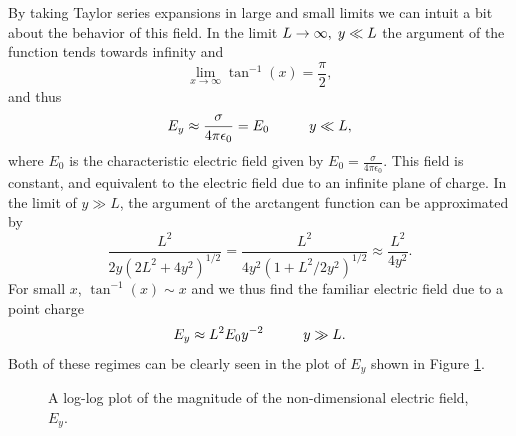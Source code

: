 \documentclass[12pt,a4paper,oneside]{book}
\begin{document}
By taking Taylor series expansions in large and small limits we can intuit a bit about the behavior of this field. In the limit $L \rightarrow \infty, \hspace{1mm} y \ll L$ the argument of the function tends towards infinity and
\[ \lim_{x\to\infty} \tan^{-1}(x) = \frac{\pi}{2}
,\]
and thus
\begin{equation}
E_y \approx \frac{\sigma}{4 \pi \epsilon_0} = E_0 \hspace{10mm} y \ll L
,\end{equation}
where $E_0$ is the characteristic electric field given by $E_0 = \frac{\sigma}{4 \pi \epsilon_0}$. This field is constant, and equivalent to the electric field due to an infinite plane of charge. In the limit of $y \gg L$, the argument of the arctangent function can be approximated by
\[ \frac{L^2}{2 y \left( 2 L^2 + 4 y^2\right)^{1/2}} = \frac{L^2}{4 y^2 \left( 1 + L^2/2y^2 \right)^{1/2}} \approx \frac{L^2}{4 y^2}
.\]
For small $x$, $\tan^{-1}(x) \sim x$ and we thus find the familiar electric field due to a point charge
\begin{equation}
E_y \approx L^2 E_0 y^{-2}  \hspace{10mm} y \gg L
.\end{equation}
Both of these regimes can be clearly seen in the plot of $E_y$ shown in Figure \ref{fig:E0}.
\begin{figure}[htb]
    \centering
    
    \caption{A log-log plot of the magnitude of the non-dimensional electric field, $E_y$.\label{fig:E0}}
\end{figure}
\newpage
\end{document}
